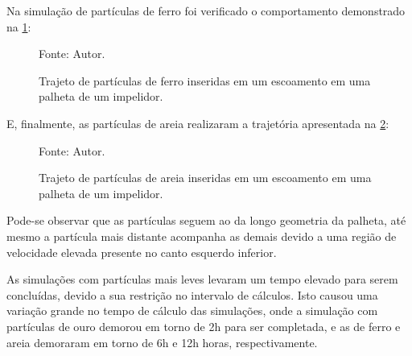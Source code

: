 Na simulação de partículas de ferro foi verificado o comportamento demonstrado na \ref{rotor_trajectory_iron}:
\begin{figure}[H]
    \centering
     {\raggedleft \scriptsize Fonte: Autor.}
    \caption{Trajeto de partículas de ferro inseridas em um escoamento em uma palheta de um impelidor.}
    \label{rotor_trajectory_iron}
\end{figure}

E, finalmente, as partículas de areia realizaram a trajetória apresentada na \ref{rotor_trajectory_sand}:
\begin{figure}[H]
    \centering
     {\raggedleft \scriptsize Fonte: Autor.}
    \caption{Trajeto de partículas de areia inseridas em um escoamento em uma palheta de um impelidor.}
    \label{rotor_trajectory_sand}
\end{figure}

Pode-se observar que as partículas seguem ao da longo geometria da palheta, até mesmo a partícula mais distante acompanha as demais devido a uma região de velocidade elevada presente no canto esquerdo inferior.

As simulações com partículas mais leves levaram um tempo elevado para serem concluídas, devido a sua restrição no intervalo de cálculos.
Isto causou uma variação grande no tempo de cálculo das simulações, onde a simulação com partículas de ouro demorou em torno de 2h para ser completada, e as de ferro e areia demoraram em torno de 6h e 12h horas, respectivamente.